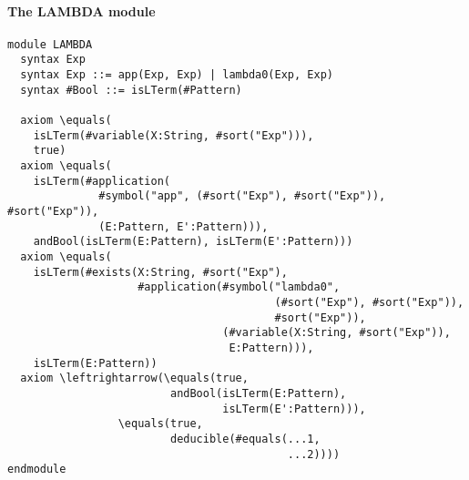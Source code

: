 \documentclass[UTF8,11pt]{article}
\theoremstyle{plain}
\theoremstyle{definition}
\theoremstyle{remark}
\begin{document}
\paragraph{The {\small LAMBDA} module}\quad
\begin{Verbatim}[fontsize=\small]
module LAMBDA
  syntax Exp
  syntax Exp ::= app(Exp, Exp) | lambda0(Exp, Exp)
  syntax #Bool ::= isLTerm(#Pattern)

  axiom \equals(
    isLTerm(#variable(X:String, #sort("Exp"))), 
    true)
  axiom \equals(
    isLTerm(#application(
              #symbol("app", (#sort("Exp"), #sort("Exp")), #sort("Exp")),
              (E:Pattern, E':Pattern))),
    andBool(isLTerm(E:Pattern), isLTerm(E':Pattern)))
  axiom \equals(
    isLTerm(#exists(X:String, #sort("Exp"),
                    #application(#symbol("lambda0",
                                         (#sort("Exp"), #sort("Exp")),
                                         #sort("Exp")),
                                 (#variable(X:String, #sort("Exp")),
                                  E:Pattern))),
    isLTerm(E:Pattern))
  axiom \leftrightarrow(\equals(true, 
                         andBool(isLTerm(E:Pattern), 
                                 isLTerm(E':Pattern))),
                 \equals(true,
                         deducible(#equals(...1,
                                           ...2)))) 
endmodule
\end{Verbatim}




\end{document}
